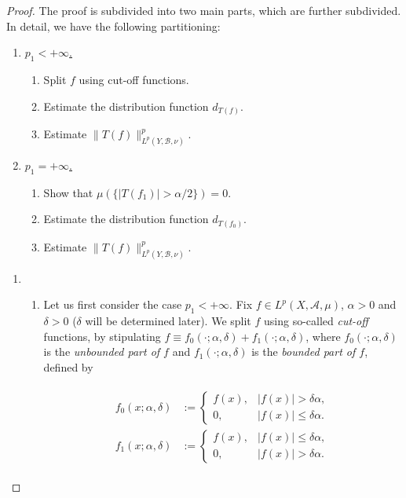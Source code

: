 \begin{proof}
	The proof is subdivided into two main parts, which are further subdivided. In detail, we have the following partitioning:

	\begin{enumerate}[label = \textbf{(\roman*.)}]
		\item \underline{$p_1 < + \infty$.}
			\begin{enumerate}[label = \textbf{\alph*.}]
				\item Split $f$ using cut-off functions.
				\item Estimate the distribution function $d_{T(f)}$.
				\item Estimate $\|T(f)\|_{L^p(Y,\mathcal{B},\nu)}^p$.
			\end{enumerate}
		\item \underline{$p_1 = + \infty$.}
			\begin{enumerate}[label = \textbf{\alph*.}]
				\item Show that $\mu(\{\vert T(f_1)\vert > \alpha/2\}) = 0$.
				\item Estimate the distribution function $d_{T(f_0)}$.
				\item Estimate $\|T(f)\|_{L^p(Y,\mathcal{B},\nu)}^p$.
			\end{enumerate}
	\end{enumerate}

	\begin{enumerate}[label = \textbf{(\roman*.)}]
		\item 
			\begin{enumerate}[label = \textbf{\alph*.}]
				\item Let us first consider the case \underline{$p_1 < + \infty$}. Fix $f \in L^p(X,\mathcal{A},\mu)$, $\alpha > 0$ and $\delta > 0$ ($\delta$ will be determined later). We split $f$ using so-called \emph{cut-off} functions, by stipulating $f \equiv f_0(\cdot;\alpha,\delta) + f_1(\cdot;\alpha,\delta)$, where $f_0(\cdot;\alpha,\delta)$ is the \emph{unbounded part of $f$} and $f_1(\cdot;\alpha,\delta)$ is the \emph{bounded part of $f$}, defined by

	\begin{gather}
		\begin{aligned}
			f_0(x;\alpha,\delta) &:= \begin{cases}
				f(x), & \vert f(x) \vert > \delta \alpha,\\
				0, & \vert f(x)\vert \leqslant \delta \alpha.
			\end{cases}\\
			f_1(x;\alpha,\delta) &:= \begin{cases}
				f(x), & \vert f(x) \vert \leqslant \delta \alpha,\\
				0, & \vert f(x)\vert > \delta \alpha.
			\end{cases}
		\end{aligned}
		\label{eq:cut_off}
	\end{gather}


\end{enumerate}
\end{enumerate}
\end{proof}
